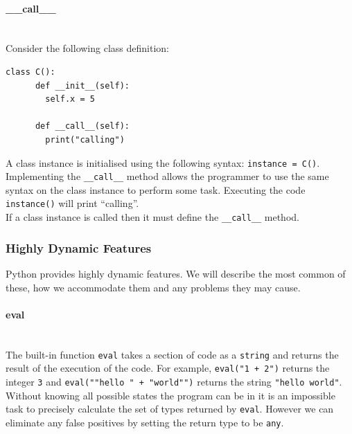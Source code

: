 \documentclass[12pt, titlepage]{article}
\begin{document}
\paragraph*{\_\_call\_\_} \mbox{} \\
Consider the following class definition:
\begin{lstlisting}[mathescape]
    class C():
      def __init__(self):
        self.x = 5
			
      def __call__(self):
        print("calling")
\end{lstlisting}
A class instance is initialised using the following syntax: \texttt{instance = C()}. Implementing the \texttt{\_\_call\_\_} method allows the programmer to use the same syntax on the class instance to perform some task. Executing the code \texttt{instance()} will print ``calling''. \\
\indent If a class instance is called then it must define the \texttt{\_\_call\_\_} method.


\subsubsection{Highly Dynamic Features}
\label{chap:highlyDynamic}
Python provides highly dynamic features. We will describe the most common of these, how we accommodate them and any problems they may cause. 
\paragraph*{eval}\mbox{} \\
The built-in function \texttt{eval} takes a section of code as a \texttt{string} and returns the result of the execution of the code. For example, \texttt{eval("1 + 2")} returns the integer \texttt{3} and  \texttt{eval(""hello " + "world"")} returns the string \texttt{"hello world"}. Without knowing all possible states the program can be in it is an impossible task to precisely calculate the set of types returned by \texttt{eval}. However we can eliminate any false positives by setting the return type to be \texttt{any}.
\end{document}
